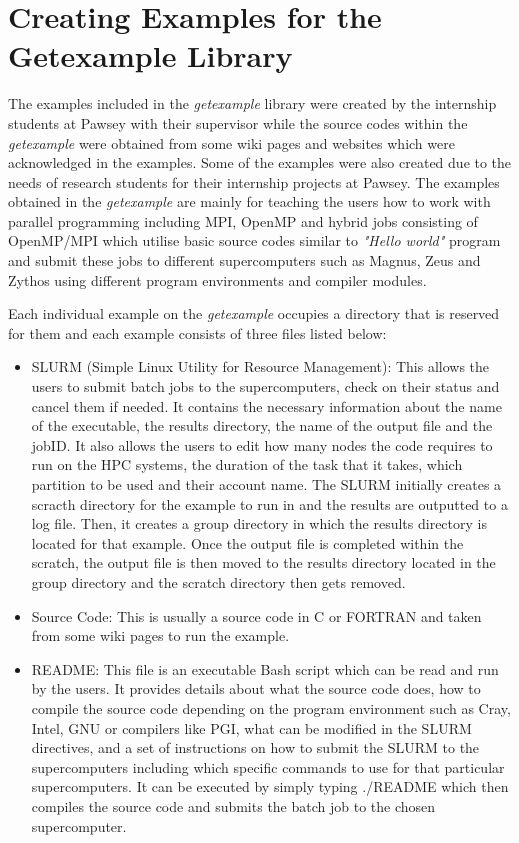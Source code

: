 \section{Creating Examples for the Getexample Library}

The examples included in the \emph{getexample} library were created by the internship students at Pawsey with their supervisor while the source codes within the
\emph{getexample} were obtained from some wiki pages and websites which were acknowledged in the examples. Some of the examples were also created due to the
needs of research students for their internship projects at Pawsey. The examples obtained in the \emph{getexample} are mainly for teaching the users how to work
with parallel programming including MPI, OpenMP and hybrid jobs consisting of OpenMP/MPI which utilise basic source codes similar to \emph{"Hello world"} 
program and submit these jobs to different supercomputers such as Magnus, Zeus and Zythos using different program environments and compiler modules. 

Each individual example on the \emph{getexample} occupies a directory that is reserved for them and each example consists of three files listed below:

\begin{itemize}    
\item SLURM (Simple Linux Utility for Resource Management): This allows the users to submit batch jobs to the supercomputers, check on their status and 
cancel them if needed. It contains the necessary information about the name of the executable, the results directory, the name of the output file and 
the jobID. It also allows the users to edit how many nodes the code requires to run on the HPC systems, the duration of the task that it takes, which 
partition to be used and their account name. The SLURM initially creates a scracth directory for the example to run in and the results are outputted to 
a log file. Then, it creates a group directory in which the results directory is located for that example. Once the output file is completed within the 
scratch, the output file is then moved to the results directory located in the group directory and the scratch directory then gets removed.
\item Source Code: This is usually a source code in C or FORTRAN and taken from some wiki pages to run the example.
\item README: This file is an executable Bash script which can be read and run by the users. It provides details about what the source code does,
how to compile the source code depending on the program environment such as Cray, Intel, GNU or compilers like PGI, what can be modified in the SLURM 
directives, and a set of instructions on how to submit the SLURM to the supercomputers including which specific commands to use for that particular 
supercomputers. It can be executed by simply typing ./README which then compiles the source code and submits the batch job to the chosen supercomputer.
\end{itemize}

